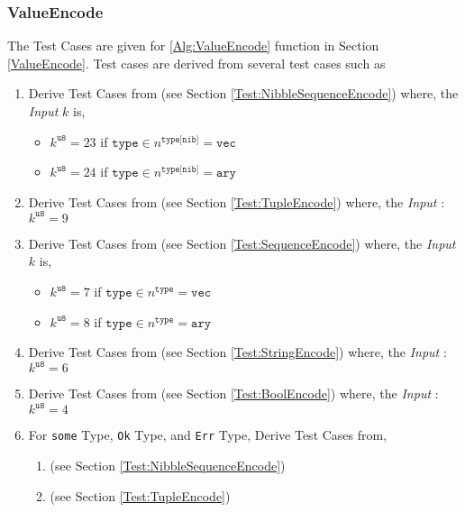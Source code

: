 \documentclass[../alan-handbook.tex]{subfiles}
\begin{document}
\subsubsection{ValueEncode} \label{Test:ValueEncode}

The Test Cases are given for  \ref{Alg:ValueEncode} function in Section \ref{ValueEncode}. Test cases are derived from several test cases such as 

\begin{enumerate}
    \item Derive Test Cases from  (see Section \ref{Test:NibbleSequenceEncode}) where, the \textit{Input} $k$ is,
        \begin{itemize}
            \item $k^{\texttt{u8}}=23$ if $\texttt{type} \in n^{\texttt{type[nib]}} = \texttt{vec}$ 
            \item $k^{\texttt{u8}}=24$ if $\texttt{type} \in n^{\texttt{type[nib]}} = \texttt{ary}$
        \end{itemize}
    \item Derive Test Cases from  (see Section \ref{Test:TupleEncode}) where, the \textit{Input} : $k^{\texttt{u8}}=9$
    \item Derive Test Cases from  (see Section \ref{Test:SequenceEncode}) where, the \textit{Input} $k$ is,
        \begin{itemize}
            \item $k^{\texttt{u8}}=7$ if $\texttt{type} \in n^{\texttt{type}} = \texttt{vec}$
            \item $k^{\texttt{u8}}=8$ if $\texttt{type} \in n^{\texttt{type}} = \texttt{ary}$
        \end{itemize}
    \item Derive Test Cases from  (see Section \ref{Test:StringEncode}) where, the \textit{Input} : $k^{\texttt{u8}}=6$
    \item Derive Test Cases from  (see Section \ref{Test:BoolEncode}) where, the \textit{Input} : $k^{\texttt{u8}}=4$
    \item For \texttt{some} Type, \texttt{Ok} Type, and \texttt{Err} Type, Derive Test Cases from, 
        \begin{enumerate}
            \item {} (see Section \ref{Test:NibbleSequenceEncode})
            \item {} (see Section \ref{Test:TupleEncode})

\end{enumerate}
\end{enumerate}
\end{document}
